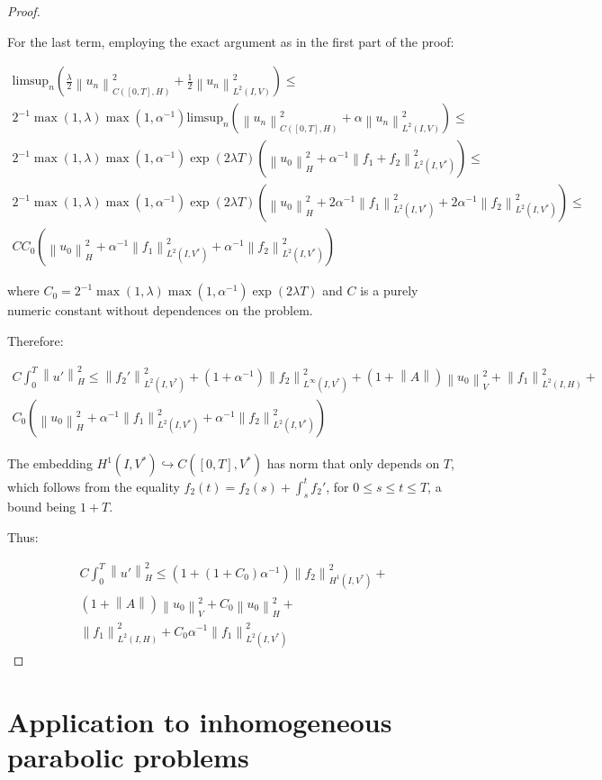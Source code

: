 \documentclass[english,a4paper,12pt,oneside]{scrbook}
\theoremstyle{break}
\newenvironment{mproof}[1][\proofname]{%
  \begin{proof}[#1]$ $\par\nobreak\ignorespaces
}{%
  \end{proof}
}
\renewcommand*{\proofname}{Proof}
\theoremstyle{remark}
\newcommand{\ds}{\displaystyle}
\newcommand{\norm}[1]{\left\lVert#1\right\rVert}
\newcommand{\HN}[1]{\norm{#1}_{H}}
\newcommand{\VN}[1]{\norm{#1}_{V}}
\newcommand{\emb}{\hookrightarrow}
\begin{document}
\begin{mproof}
For the last term, employing the exact argument as in the first part of the proof:

\begin{align*}
\text{limsup}_n \left ( \frac{\lambda}{2}\norm{u_n}_{C([0,T],H)}^2 + \frac{1}{2}\norm{u_n}_{L^2(I,V)}^2 \right )\leq\\
2^{-1}\max(1,\lambda)\max(1,\alpha^{-1}) \text{limsup}_n \left ( \norm{u_n}_{C([0,T],H)}^2 + {\alpha}\norm{u_n}_{L^2(I,V)}^2 \right )\leq\\
2^{-1}\max(1,\lambda)\max(1,\alpha^{-1})\exp(2\lambda T)(\HN{u_0}^2+\alpha^{-1}\norm{f_1+f_2}^2_{L^2(I,V^*)}) \leq \\
2^{-1}\max(1,\lambda)\max(1,\alpha^{-1})\exp(2\lambda T)(\HN{u_0}^2+2\alpha^{-1}\norm{f_1}^2_{L^2(I,V^*)}+2\alpha^{-1}\norm{f_2}^2_{L^2(I,V^*)}) \leq \\
C C_0(\HN{u_0}^2+\alpha^{-1}\norm{f_1}^2_{L^2(I,V^*)}+\alpha^{-1}\norm{f_2}^2_{L^2(I,V^*)})
\end{align*}


where $C_0 = \ds 2^{-1}\max(1,\lambda)\max(1,\alpha^{-1})\exp(2\lambda T)$ and $C$ is a purely numeric constant without dependences on the problem.

Therefore:

\begin{align*}
C\int_0^T\HN{u'}^2\leq 
\norm{f_2'}_{L^2(I,V^*)}^2+(1+\alpha^{-1})\norm{f_2}_{L^\infty(I,V^*)}^2+(1+\norm{A})\VN{u_{0}}^2+\norm{f_1}_{L^2(I,H)}^2+\\
C_0(\HN{u_0}^2+\alpha^{-1}\norm{f_1}^2_{L^2(I,V^*)}+\alpha^{-1}\norm{f_2}^2_{L^2(I,V^*)})
\end{align*}


The embedding $H^1(I,V^*)\emb C([0,T],V^*)$ has norm that only depends on $T$, which follows from the equality $f_2(t)=f_2(s)+\int_s^tf_2'$, for $0\leq s \leq t \leq T$, a bound being $1+T$.

Thus:

\begin{align*}
C\int_0^T\HN{u'}^2\leq 
(1+(1+C_0)\alpha^{-1})\norm{f_2}_{H^1(I,V^*)}^2+\\
(1+\norm{A})\VN{u_{0}}^2+C_0\HN{u_0}^2+\\
\norm{f_1}_{L^2(I,H)}^2+C_0\alpha^{-1}\norm{f_1}^2_{L^2(I,V^*)}
\end{align*}


\end{mproof}

\section{Application to inhomogeneous parabolic problems}
\end{document}

